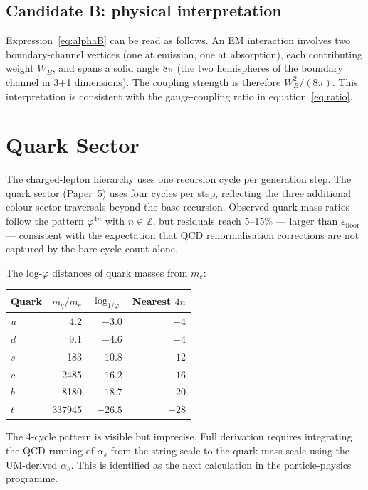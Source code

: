 \documentclass[12pt]{article}
\begin{document}
\subsection{Candidate B: physical interpretation}

Expression~\eqref{eq:alphaB} can be read as follows. An EM
interaction involves two boundary-channel vertices (one at emission,
one at absorption), each contributing weight $W_B$, and spans a
solid angle $8\pi$ (the two hemispheres of the boundary channel in
3+1 dimensions). The coupling strength is therefore $W_B^2/(8\pi)$.
This interpretation is consistent with the gauge-coupling ratio in
equation~\eqref{eq:ratio}.

\section{Quark Sector}

The charged-lepton hierarchy uses one recursion cycle per generation
step. The quark sector (Paper~5) uses four cycles per step,
reflecting the three additional colour-sector traversals beyond the
base recursion. Observed quark mass ratios follow the pattern
$\varphi^{4n}$ with $n \in \mathbb{Z}$, but residuals reach 5--15\%
— larger than $\varepsilon_{\text{floor}}$ — consistent with the
expectation that QCD renormalisation corrections are not captured by
the bare cycle count alone.

The log-$\varphi$ distances of quark masses from $m_e$:
\begin{center}
\begin{tabular}{lrrr}
\toprule
Quark & $m_q/m_e$ & $\log_{1/\varphi}$ & Nearest $4n$ \\
\midrule
$u$ & 4.2  & $-3.0$  & $-4$ \\
$d$ & 9.1  & $-4.6$  & $-4$ \\
$s$ & 183  & $-10.8$ & $-12$ \\
$c$ & 2485 & $-16.2$ & $-16$ \\
$b$ & 8180 & $-18.7$ & $-20$ \\
$t$ & 337945 & $-26.5$ & $-28$ \\
\bottomrule
\end{tabular}
\end{center}

The 4-cycle pattern is visible but imprecise. Full derivation
requires integrating the QCD running of $\alpha_s$ from the string
scale to the quark-mass scale using the UM-derived $\alpha_s$. This
is identified as the next calculation in the particle-physics programme.
\end{document}
